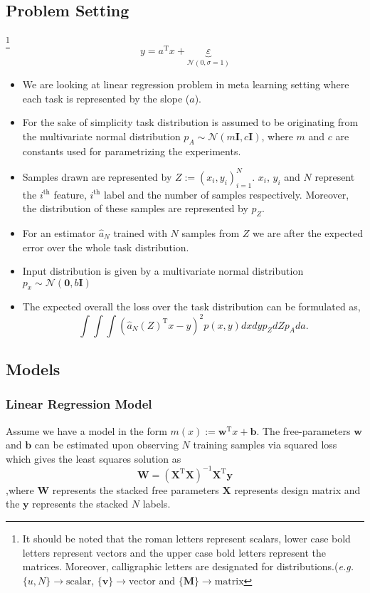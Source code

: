 \subsection{Problem Setting}
\footnote{It should be noted that the roman letters represent scalars, lower case bold letters represent vectors and the upper case bold letters represent the matrices. Moreover, calligraphic letters are designated for distributions.(\textit{e.g.} $\{u,N\}\to\text{scalar}$, $\{\bm{v}\}\to\text{vector}$ and $\{\bm{M}\}\to\text{matrix}$}
\begin{equation}\label{eq:reg}
  y = a^\text{T}x + \underbrace{\varepsilon}_{\mathcal{N}(0,\sigma=1)}
\end{equation}
\begin{itemize}
  \item We are looking at linear regression problem in meta learning setting where each task is represented by the slope ($a$).
  \item For the sake of simplicity  task distribution is assumed to be originating from the multivariate normal distribution $p_A\sim\mathcal{N}(m\boldsymbol{I},c\boldsymbol{I})$, where $m$ and $c$ are constants used for parametrizing the experiments.
  \item Samples drawn are represented by $Z:=(x_i,y_i)_{i=1}^{N}$. $x_i$, $y_i$ and $N$ represent the $i^{\text{th}}$ feature, $i^{\text{th}}$ label and the number of samples respectively. Moreover, the distribution of these samples are represented by $p_Z$.
  \item For an estimator $\hat{a}_N$ trained with $N$ samples from $Z$ we are after the expected error over the whole task distribution.
  \item Input distribution is given by a multivariate normal distribution $p_x \sim \mathcal{N}(\boldsymbol{0},b\boldsymbol{I})$
  \item The expected overall the loss over the task distribution can be formulated as,
  \begin{equation}\label{eq:loss}
    \int\int\int(\hat{a}_N(Z)^\text{T}x-y)^2p(x,y)dxdyp_ZdZp_Ada.
  \end{equation}
\end{itemize}

\subsection{Models}

\subsubsection{Linear Regression Model}\label{section:Linear}
Assume we have a model in the form $m(x):= \mathbf{w}^\text{T}x+\mathbf{b}$. The free-parameters $\mathbf{w}$ and $\mathbf{b}$ can be estimated upon observing $N$ training samples via squared loss which gives the least squares solution as
\begin{equation}
  \mathbf{W}=(\mathbf{X}^{\text{T}}\mathbf{X})^{-1}\mathbf{X}^{\text{T}}\mathbf{y}
\end{equation}
,where $\mathbf{W}$ represents the stacked free parameters $\mathbf{X}$ represents design matrix and the $\mathbf{y}$ represents the stacked $N$ labels.

